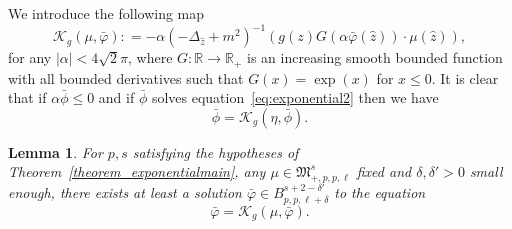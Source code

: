 \documentclass[a4paper,10pt]{article}
\newtheorem{lemma}{Lemma}
\begin{document}
We introduce the following map
\[ \mathcal{K}_g (\mu, \bar{\varphi}) : = - \alpha (- \Delta_{\hat{z}} +
   m^2)^{- 1} (g (z) G (\alpha \bar{\varphi} (\hat{z})) \cdot \mu (\hat{z})),
\]
for any $| \alpha | < 4 \sqrt{2} \pi$, where $G : \mathbb{R} \rightarrow
\mathbb{R}_+$ is an increasing smooth bounded function with all bounded
derivatives such that $G (x) = \exp (x)$ for $x \leqslant 0$. It is clear that
if $\alpha \bar{\phi} \leqslant 0$ and if $\bar{\phi}$ solves
equation~{\eqref{eq:exponential2}} then we have
\[ \bar{\phi} = \mathcal{K}_g (\eta, \bar{\phi}) . \]
\begin{lemma}
  \label{lemma_exponentialexistence}For $p, s$ satisfying the hypotheses of
  Theorem~\ref{theorem_exponentialmain}, any $\mu \in \mathfrak{M}^s_{+, p, p,
  \ell}$ fixed and $\delta, \delta' > 0$ small enough, there exists at least a
  solution $\bar{\varphi} \in B^{s + 2 - \delta'}_{p, p, \ell + \delta}$ to
  the equation
  \begin{equation}
    \bar{\varphi} = \mathcal{K}_g (\mu, \bar{\varphi}) . \label{eq:K1}
  \end{equation}
\end{lemma}
\end{document}
